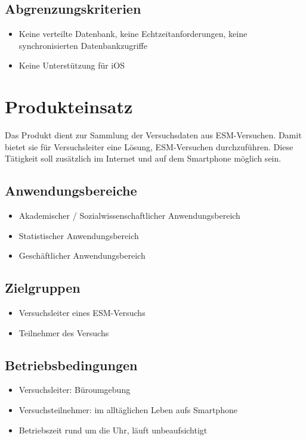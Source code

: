\documentclass[a4paper]{scrreprt}
\begin{document}
        \section{Abgrenzungskriterien}
            \begin{itemize}
                \item Keine verteilte Datenbank, keine Echtzeitanforderungen, keine synchronisierten Datenbankzugriffe
                \item Keine Unterst\"utzung f\"ur iOS
            \end{itemize}

    \chapter{Produkteinsatz}
        Das Produkt dient zur Sammlung der Versuchsdaten aus ESM-Versuchen. Damit bietet sie für Versuchsleiter eine Lösung, ESM-Versuchen durchzuführen. Diese Tätigkeit soll zusätzlich im Internet und auf dem Smartphone möglich sein.

        \section{Anwendungsbereiche}
            \begin{itemize}
                \item Akademischer / Sozialwissenschaftlicher Anwendungsbereich
                \item Statistischer Anwendungsbereich
                \item Geschäftlicher Anwendungsbereich
            \end{itemize}

        \section{Zielgruppen}
            \begin{itemize}
                \item Versuchsleiter eines ESM-Versuchs
                \item Teilnehmer des Versuchs
            \end{itemize}

        \section{Betriebsbedingungen}
            \begin{itemize}
                \item Versuchsleiter: Büroumgebung
                \item Versuchsteilnehmer: im alltäglichen Leben aufs Smartphone
                \item Betriebszeit rund um die Uhr, läuft unbeaufsichtigt
            \end{itemize}
\end{document}
